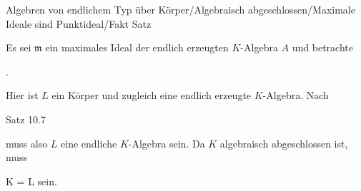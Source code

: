 {Algebren von endlichem Typ über Körper/Algebraisch abgeschlossen/Maximale Ideale sind Punktideal/Fakt}
{Satz}
{}
{



\faktsituation {}
\faktzusatz {}





}
{





Es sei ${\mathfrak m}$ ein maximales Ideal der endlich erzeugten $K$-Algebra $A$ und betrachte

 { . }

Hier ist $L$ ein Körper und zugleich eine endlich erzeugte $K$-Algebra. Nach

Satz 10.7

muss also $L$ eine endliche $K$-Algebra sein. Da $K$ algebraisch abgeschlossen ist, muss

\mavergleichskette
{\vergleichskette
{ K
}
{ = }{ L
}
{  }{
}
{    }{
}
{   }{
}
}
{}{}{}
sein.




}
